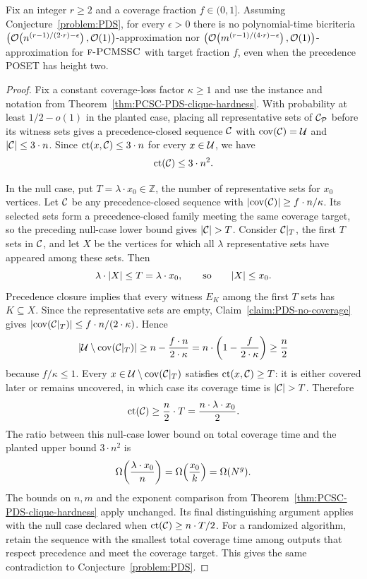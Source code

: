 \begin{theorem}\label{thm:PCMSSC-PDS-clique-hardness}
    \setlength{\emergencystretch}{1em}
    Fix an integer $r\geq2$ and a coverage fraction $f\in(0,1]$. Assuming Conjecture~\ref{problem:PDS}, for every $\epsilon>0$ there is no polynomial-time bicriteria $\mathopen{}\left( \mathcal{O}\mathopen{}\left( n^{(r-1)/(2\cdot r)-\epsilon} \right),\mathcal{O}\mathopen{}\left( 1 \right) \right)$-approximation nor $\mathopen{}\left( \mathcal{O}\mathopen{}\left( m^{(r-1)/(4\cdot r)-\epsilon} \right),\mathcal{O}\mathopen{}\left( 1 \right) \right)$-approximation for $\textup{\textsc{f-PCMSSC}}$ with target fraction $f$, even when the precedence POSET has height two.
\end{theorem}
\begin{proof}
    Fix a constant coverage-loss factor $\kappa\geq1$ and use the instance and notation from Theorem~\ref{thm:PCSC-PDS-clique-hardness}. With probability at least $1/2-o(1)$ in the planted case, placing all representative sets of $\mathcal{C}_{\mathcal P}$ before its witness sets gives a precedence-closed sequence $\mathcal{C}$ with $\operatorname{cov}\mathopen{}\left( \mathcal{C} \right)=\mathcal{U}$ and $\mathopen{}\left| \mathcal{C} \right|\leq3\cdot n$. Since $\operatorname{ct}\mathopen{}\left( x,\mathcal{C} \right)\leq3\cdot n$ for every $x\in\mathcal{U}$, we have
    \[
        \operatorname{ct}\mathopen{}\left( \mathcal{C} \right)\leq3\cdot n^2.
    \]

    In the null case, put $T=\lambda\cdot x_0\in\mathbb{Z}$, the number of representative sets for $x_0$ vertices. Let $\mathcal{C}$ be any precedence-closed sequence with $\mathopen{}\left| \operatorname{cov}\mathopen{}\left( \mathcal{C} \right) \right|\geq f\cdot n/\kappa$. Its selected sets form a precedence-closed family meeting the same coverage target, so the preceding null-case lower bound gives $\spr{\cC}>T$. Consider $\mathcal{C}|_{T}$, the first $T$ sets in $\mathcal{C}$, and let $X$ be the vertices for which all $\lambda$ representative sets have appeared among these sets. Then
    \[
        \lambda \cdot \mathopen{}\left| X \right|\leq T=\lambda \cdot x_0,
        \qquad\text{so}\qquad \mathopen{}\left| X \right|\leq x_0.
    \]
    Precedence closure implies that every witness $E_K$ among the first $T$ sets has $K\subseteq X$. Since the representative sets are empty, Claim~\ref{claim:PDS-no-coverage} gives $\mathopen{}\left| \operatorname{cov}\mathopen{}\left( \mathcal{C}|_{T} \right) \right|\leq f\cdot n/(2\cdot\kappa)$. Hence
    \[
        \mathopen{}\left| \mathcal{U}\setminus\operatorname{cov}\mathopen{}\left( \mathcal{C}|_{T} \right) \right|
        \geq n-\frac{f\cdot n}{2\cdot\kappa}
        =n \cdot \mathopen{}\left( 1-\frac{f}{2\cdot\kappa} \right)
        \geq\frac{n}{2}
    \]
    because $f/\kappa\leq1$. Every $x\in\mathcal{U}\setminus\operatorname{cov}\mathopen{}\left( \mathcal{C}|_{T} \right)$ satisfies $\operatorname{ct}\mathopen{}\left( x,\mathcal{C} \right)\geq T$: it is either covered later or remains uncovered, in which case its coverage time is $\spr{\cC}>T$. Therefore
    \[
        \operatorname{ct}\mathopen{}\left( \mathcal{C} \right)\geq\frac{n}{2} \cdot T
        =\frac{n \cdot \lambda \cdot x_0}{2}.
    \]
    The ratio between this null-case lower bound on total coverage time and the planted upper bound $3\cdot n^2$ is
    \[
        \Omega\mathopen{}\left( \frac{\lambda \cdot x_0}{n} \right)
        =\Omega\mathopen{}\left( \frac{x_0}{k} \right)
        =\Omega(N^g).
    \]
    The bounds on $n,m$ and the exponent comparison from Theorem~\ref{thm:PCSC-PDS-clique-hardness} apply unchanged. Its final distinguishing argument applies with the null case declared when $\operatorname{ct}\mathopen{}\left( \mathcal{C} \right)\geq n\cdot T/2$. For a randomized algorithm, retain the sequence with the smallest total coverage time among outputs that respect precedence and meet the coverage target. This gives the same contradiction to Conjecture~\ref{problem:PDS}.
\end{proof}

